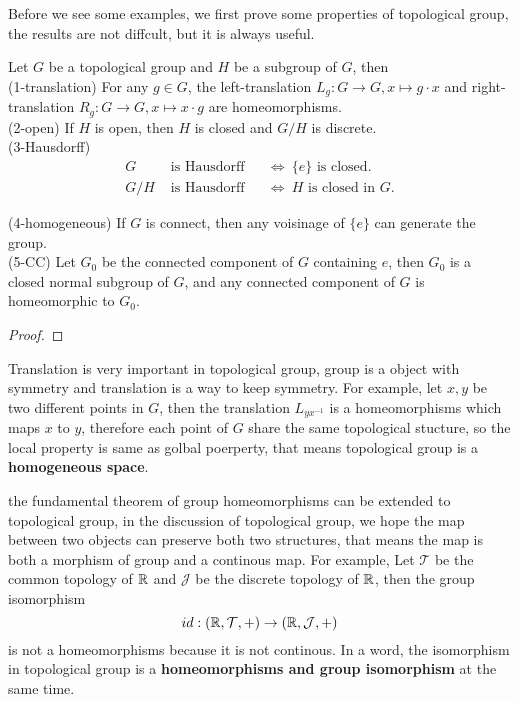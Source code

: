 \documentclass[12pt,a4paper]{article}
\begin{document}
Before we see some examples, we first prove some properties of topological group, the results are not diffcult, but it is always useful.

\begin{proposition}
    Let \(G\) be a topological group and \(H\) be a subgroup of \(G\), then\\

    (1-translation) For any \(g \in G\), the left-translation \(L_g: G \to G, x \mapsto g \cdot x\) and right-translation \(R_g: G \to G, x \mapsto x \cdot g\) are homeomorphisms.\\

     (2-open) If \(H\) is open, then \(H\) is closed and \(G/H\) is discrete.\\

    (3-Hausdorff)
    \[
    \begin{aligned}
    G &\text{ is Hausdorff} &&\Longleftrightarrow\ \{e\}\text{ is closed}.\\
    G/H &\text{ is Hausdorff} &&\Longleftrightarrow\ H\text{ is closed in }G.
    \end{aligned}
    \]

    (4-homogeneous) If \(G\) is connect, then any voisinage of \(\{e\}\) can generate the group.\\

    (5-CC) Let \(G_0\) be the connected component of \(G\) containing \(e\), then \(G_0\) is a closed normal subgroup of \(G\), and any connected component of \(G\) is homeomorphic to \(G_0\).

\end{proposition}

\begin{proof}
    
\end{proof}

\begin{remark}
    Translation is very important in topological group, group is a object with symmetry and translation is a way to keep symmetry. For example, let \(x,y\) be two different points in \(G\), then the translation \(L_{yx^{-1}}\) is a homeomorphisms which maps \(x\) to \(y\), therefore each point of \(G\) share the same topological stucture, so the local property is same as golbal poerperty, that means topological group is a \textbf{homogeneous space}.
\end{remark}

the fundamental theorem of group homeomorphisms can be extended to topological group, in the discussion of topological group, we hope the map between two objects can preserve both two structures, that means the map is both a morphism of group and a continous map. For example, Let \(\mathcal{T}\) be the common topology of \(\mathbb{R}\) and \(\mathcal{J}\) be the discrete topology of \(\mathbb{R}\), then the group isomorphism 
\[ id: (\mathbb{R},\mathcal{T},+) \to (\mathbb{R},\mathcal{J},+) \]
is not a homeomorphisms because it is not continous. In a word, the isomorphism in topological group is a \textbf{homeomorphisms and group isomorphism} at the same time.
\end{document}
